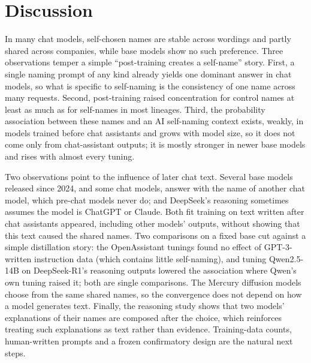 \documentclass[11pt]{article}
\begin{document}
\section{Discussion}
In many chat models, self-chosen names are stable across wordings and partly shared across companies, while base models
show no such preference. Three observations temper a simple ``post-training creates a self-name'' story. First, a
single naming prompt of any kind already yields one dominant answer in chat models, so what is specific to self-naming
is the consistency of one name across many requests. Second, post-training raised concentration for control names at
least as much as for self-names in most lineages. Third, the probability association between these names and an AI
self-naming context exists, weakly, in models trained before chat assistants and grows with model size, so it does not
come only from chat-assistant outputs; it is mostly stronger in newer base models and rises with almost every
tuning.

Two observations point to the influence of later chat text. Several base models released since 2024, and some chat
models, answer with the name of another chat model, which pre-chat models never do; and DeepSeek's reasoning sometimes
assumes the model is ChatGPT or Claude. Both fit training on text written after chat assistants appeared, including
other models' outputs, without showing that this text caused the shared names. Two comparisons on a fixed base cut
against a simple distillation story: the OpenAssistant tunings found no effect of GPT-3-written instruction data
(which contains little self-naming), and tuning Qwen2.5-14B on DeepSeek-R1's reasoning outputs lowered the
association where Qwen's own tuning raised it; both are single comparisons. The Mercury diffusion models choose from
the same shared names, so the convergence does not depend on how a model generates text. Finally, the reasoning study
shows that two models' explanations of their names are composed after the choice, which reinforces treating such
explanations as text rather than evidence. Training-data counts, human-written prompts and a frozen confirmatory
design are the natural next steps.
\end{document}
